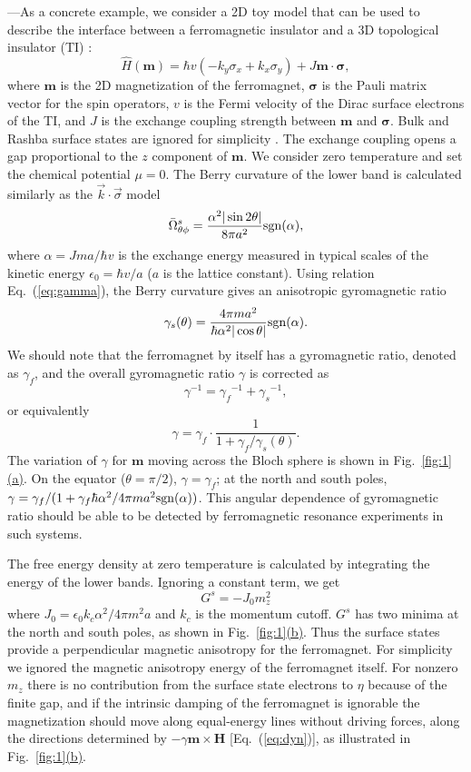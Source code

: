 \documentclass[aps,prb,twocolumn,showpacs,superscriptaddress]{revtex4-1}
\def\be{\begin{equation}} \def\ee{\end{equation}}
\newcommand{\subref}[2]{\ref{#1}\hyperref[#1]{#2}}
\begin{document}
---As a concrete example, we consider a 2D toy model that can be used to describe the interface between a ferromagnetic insulator and a 3D topological insulator (TI) \cite{Garate:2010, Yokoyama:2010, tserkovnyak:2012aa}:
\be
\hat H({\bm{m} }) = \hbar v  (-k_y \sigma_x + k_x\sigma_y) + J {\bm{m} }\cdot \bm{\sigma},  \label{eq:Hdirac}
\ee
where $\bm m$ is the 2D magnetization of the ferromagnet, $\bm \sigma$ is the Pauli matrix vector for the spin operators, $v$ is the Fermi velocity of the Dirac surface electrons of the TI, and $J$ is the exchange coupling strength between $\bm m$ and $\bm \sigma$. Bulk and Rashba surface states are ignored for simplicity \cite{Ghosh2018,TI_SOT_aa}. The exchange coupling opens a gap proportional to the $z$ component of $\bm m$. We consider zero temperature and set the chemical potential $\mu=0$. The Berry curvature of the lower band is calculated similarly as the $\vec k\cdot \vec \sigma$ model \cite{niu:2010rmp}
\be
\bar \Omega^s_{\theta\phi} = \frac{\alpha^2|\sin2\theta|}{8\pi a^2} {\rm sgn}(\alpha),
\ee
where $\alpha = Jma/\hbar v$ is the exchange energy measured in typical scales of the kinetic energy $\epsilon_0 = \hbar v /a$ ($a$ is the lattice constant). Using relation Eq.~(\ref{eq:gamma}), the Berry curvature gives an anisotropic gyromagnetic ratio 
\begin{eqnarray}
\gamma_s(\theta) = \frac{4\pi ma^2}{\hbar \alpha^2|\cos\theta|} {\rm sgn}(\alpha).
\end{eqnarray}
We should note that the ferromagnet by itself has a gyromagnetic ratio, denoted as $\gamma_f$, and the overall gyromagnetic ratio $\gamma$ is corrected as 
\be
\gamma^{-1} ={\gamma_f}^{-1} + {\gamma_s}^{-1},
\ee 
or equivalently
\be
\gamma = \gamma_f \cdot \frac{1}{1+\gamma_f/\gamma_s(\theta)}.
\ee
The variation of $\gamma$ for $\bm m$ moving across the Bloch sphere is shown in Fig.~\subref{fig:1}{(a)}. On the equator ($\theta = \pi/2$), $\gamma  = \gamma_f$; at the north and south poles, $\gamma = \gamma_f/(1+\gamma_f \hbar \alpha^2 /4\pi ma^2{\rm sgn}(\alpha))$. This angular dependence of gyromagnetic ratio should be able to be detected by ferromagnetic resonance experiments in such systems. 

The free energy density at zero temperature is calculated by integrating the energy of the lower bands. Ignoring a constant term, we get
\be
G^s= - J_0 m_z^2
\ee
where $J_0= {\epsilon_0 k_c  \alpha^2}/{4\pi m^2a} $ and $k_c$ is the momentum cutoff. $G^s$ has two minima at the north and south poles, as shown in Fig.~\subref{fig:1}{(b)}. Thus the surface states provide a perpendicular magnetic anisotropy for the ferromagnet. For simplicity we ignored the magnetic anisotropy energy of the ferromagnet itself. For nonzero $m_z$ there is no contribution from the surface state electrons to $\eta$ because of the finite gap, and if the intrinsic damping of the ferromagnet is ignorable the magnetization should move along equal-energy lines without driving forces, along the directions determined by $- \gamma \bm{m} \times \bm{H}$ [Eq.~(\ref{eq:dyn})], as illustrated in Fig.~\subref{fig:1}{(b)}.
\end{document}
